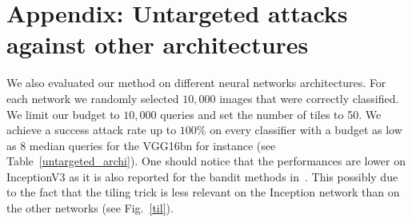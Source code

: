 \newpage


\section{Appendix: Untargeted attacks against other architectures}
\label{other_archi}

We also evaluated our method on different  neural networks architectures. For each network we randomly selected $10,000$ images that were correctly classified. We limit our budget to $10,000$ queries and set the number of tiles to 50. 
We achieve a success attack rate up to $100\%$ on every classifier with a budget as low as 8 median queries for the VGG16bn for instance (see Table~\ref{untargeted_archi}). One should notice  that the performances are lower on InceptionV3 as it is also reported for the bandit methods in~\citep{ilyas2018prior}. This possibly due to the fact that the tiling trick is less relevant on the Inception network than on the other networks (see Fig.~\ref{til}).



